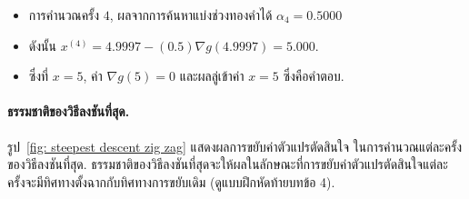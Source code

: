 \begin{myexample}
\begin{itemize}
\item การคำนวณครั้ง $4$, 
ผลจากการค้นหาแบ่งช่วงทองคำได้ $\alpha_4 = 0.5000$
\item ดังนั้น $x^{(4)} = 4.9997 - (0.5) \nabla g(4.9997) = 5.000$.

\item ซึ่งที่ $x = 5$, ค่า $\nabla g(5) = 0$ และผลลู่เข้าค่า $x = 5$ ซึ่งคือคำตอบ.
\end{itemize}


\end{myexample}

\paragraph{ธรรมชาติของวิธีลงชันที่สุด.}
รูป~\ref{fig: steepest descent zig zag} แสดงผลการขยับค่าตัวแปรตัดสินใจ ในการคำนวณแต่ละครั้งของวิธีลงชันที่สุด.
ธรรมชาติของวิธีลงชันที่สุดจะให้ผลในลักษณะที่การขยับค่าตัวแปรตัดสินใจแต่ละครั้งจะมีทิศทางตั้งฉากกับทิศทางการขยับเดิม (ดูแบบฝึกหัดท้ายบทข้อ 4).





